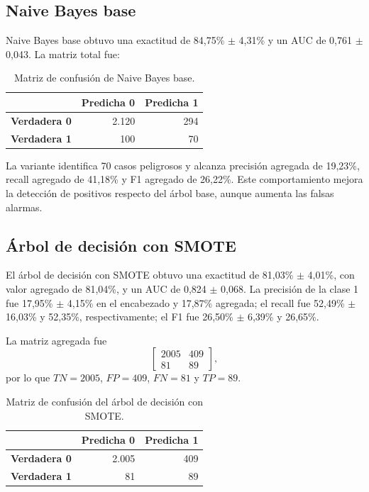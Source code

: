 \documentclass[12pt,a4paper]{article}
\begin{document}
\subsection{Naive Bayes base}

Naive Bayes base obtuvo una exactitud de 84,75\% $\pm$ 4,31\% y un AUC de 0,761 $\pm$ 0,043. La matriz total fue:

\begin{table}[H]
    \centering
    \caption{Matriz de confusión de Naive Bayes base.}
    \label{tab:nb-base-matrix}
    \begin{tabular}{lrr}
        \toprule
        & \textbf{Predicha 0} & \textbf{Predicha 1} \\
        \midrule
        \textbf{Verdadera 0} & 2.120 & 294 \\
        \textbf{Verdadera 1} & 100 & 70 \\
        \bottomrule
    \end{tabular}
\end{table}

La variante identifica 70 casos peligrosos y alcanza precisión agregada de 19,23\%, recall agregado de 41,18\% y F1 agregado de 26,22\%. Este comportamiento mejora la detección de positivos respecto del árbol base, aunque aumenta las falsas alarmas.

\subsection{Árbol de decisión con SMOTE}

El árbol de decisión con SMOTE obtuvo una exactitud de 81,03\% $\pm$ 4,01\%, con valor agregado de 81,04\%, y un AUC de 0,824 $\pm$ 0,068. La precisión de la clase 1 fue 17,95\% $\pm$ 4,15\% en el encabezado y 17,87\% agregada; el recall fue 52,49\% $\pm$ 16,03\% y 52,35\%, respectivamente; el F1 fue 26,50\% $\pm$ 6,39\% y 26,65\%.

La matriz agregada fue
\[
\begin{bmatrix}
2005 & 409 \\
81 & 89
\end{bmatrix},
\]
por lo que $TN=2005$, $FP=409$, $FN=81$ y $TP=89$.

\begin{table}[H]
    \centering
    \caption{Matriz de confusión del árbol de decisión con SMOTE.}
    \label{tab:dt-smote-matrix}
    \begin{tabular}{lrr}
        \toprule
        & \textbf{Predicha 0} & \textbf{Predicha 1} \\
        \midrule
        \textbf{Verdadera 0} & 2.005 & 409 \\
        \textbf{Verdadera 1} & 81 & 89 \\
        \bottomrule
    \end{tabular}
\end{table}
\end{document}
